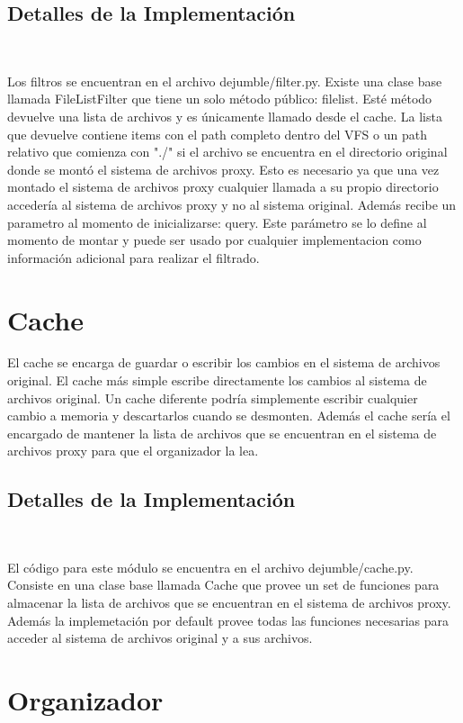 \subsection{Detalles de la Implementación}
\label{detalles_filtro}

Los filtros se encuentran en el archivo dejumble/filter.py. Existe una clase base llamada FileListFilter que tiene un solo método público: filelist. Esté método devuelve una lista de archivos y es únicamente llamado desde el cache. La lista que devuelve contiene items con el path completo dentro del VFS o un path relativo que comienza con "./" si el archivo se encuentra en el directorio original donde se montó el sistema de archivos proxy. Esto es necesario ya que una vez montado el sistema de archivos proxy cualquier llamada a su propio directorio accedería al sistema de archivos proxy y no al sistema original. Además recibe un parametro al momento de inicializarse: query. Este parámetro se lo define al momento de montar y puede ser usado por cualquier implementacion como información adicional para realizar el filtrado.


\section{Cache}
\label{cache}

El cache se encarga de guardar o escribir los cambios en el sistema de archivos original. El cache más simple escribe directamente los cambios al sistema de archivos original. Un cache diferente podría simplemente escribir cualquier cambio a memoria y descartarlos cuando se desmonten. Además el cache sería el encargado de mantener la lista de archivos que se encuentran en el sistema de archivos proxy para que el organizador la lea.

\subsection{Detalles de la Implementación}
\label{detalles_cache}

El código para este módulo se encuentra en el archivo dejumble/cache.py. Consiste en una clase base llamada Cache que provee un set de funciones para almacenar la lista de archivos que se encuentran en el sistema de archivos proxy. Además la implemetación por default provee todas las funciones necesarias para acceder al sistema de archivos original y a sus archivos. 


\section{Organizador}
\label{organizador}


